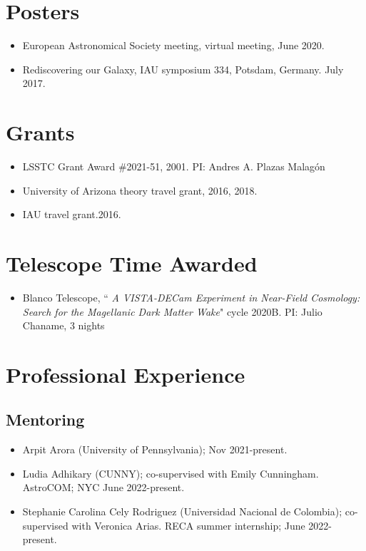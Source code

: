 \documentclass[UTF8]{article}
\begin{document}
\section*{Posters}
\begin{itemize}
\setlength\itemsep{0.0em}
\renewcommand\labelitemi{$\cdot$}
  \item European Astronomical Society meeting, virtual meeting, June 2020.
  \item Rediscovering our Galaxy, IAU symposium 334, Potsdam, Germany. July 2017.
\end{itemize}

\section*{Grants}
\begin{itemize}
\setlength\itemsep{0.0em}
\renewcommand\labelitemi{$\cdot$}
\item LSSTC Grant Award \#2021-51, 2001. PI: Andres A. Plazas Malag\'on
\item University of Arizona theory travel grant, 2016, 2018. 
\item IAU travel grant.2016.
\end{itemize}

\section*{Telescope Time Awarded}
\begin{itemize}
  \setlength\itemsep{0.0em}
  \renewcommand\labelitemi{$\cdot$}
\item Blanco Telescope, ``\textit{ A VISTA-DECam Experiment in Near-Field
  Cosmology: Search for the Magellanic Dark Matter Wake}" cycle 2020B. PI: Julio Chaname, 3 nights 
\end{itemize}


\section*{Professional Experience}

\subsection*{Mentoring}

\begin{itemize}
  \setlength\itemsep{0.0em}
  \renewcommand\labelitemi{$\cdot$}
  \item Arpit Arora (University of Pennsylvania); Nov 2021-present.
  \item Ludia Adhikary (CUNNY); co-supervised with Emily Cunningham. AstroCOM; NYC June 2022-present.
\item Stephanie Carolina Cely Rodriguez (Universidad Nacional de Colombia); co-supervised with Veronica Arias. RECA
  summer internship; June 2022-present.
\end{itemize}
\end{document}
